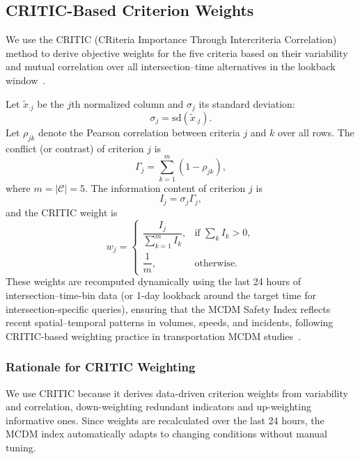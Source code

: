 \documentclass[conference]{IEEEtran}
\begin{document}
\subsection{CRITIC-Based Criterion Weights}

We use the CRITIC (CRiteria Importance Through Intercriteria Correlation) method
to derive objective weights for the five criteria based on their variability and
mutual correlation over all intersection--time alternatives in the lookback
window~\cite{Amraji2025CombinedSafetyIndex}.

Let $\tilde x_{\cdot j}$ be the $j$th normalized column and $\sigma_j$ its
standard deviation:
\[
\sigma_j = \mathrm{sd}(\tilde x_{\cdot j}).
\]
Let $\rho_{jk}$ denote the Pearson correlation between criteria $j$ and $k$
over all rows. The conflict (or contrast) of criterion $j$ is
\begin{equation}
\Gamma_j = \sum_{k=1}^m (1 - \rho_{jk}),
\end{equation}
where $m = |\mathcal{C}| = 5$. The information content of criterion $j$ is
\begin{equation}
I_j = \sigma_j \Gamma_j,
\end{equation}
and the CRITIC weight is
\begin{equation}
w_j =
\begin{cases}
\dfrac{I_j}{\sum_{k=1}^m I_k}, & \text{if }\sum_k I_k > 0,\\[0.8em]
\dfrac{1}{m}, & \text{otherwise}.
\end{cases}
\end{equation}
These weights are recomputed dynamically using the last 24 hours of
intersection--time-bin data (or 1-day lookback around the target time for
intersection-specific queries), ensuring that the MCDM Safety Index reflects
recent spatial--temporal patterns in volumes, speeds, and incidents, following
CRITIC-based weighting practice in transportation MCDM studies~\cite{Amraji2025CombinedSafetyIndex}.

\subsubsection{Rationale for CRITIC Weighting}

We use CRITIC because it derives data-driven criterion weights from variability and correlation, down-weighting redundant indicators and up-weighting informative ones. Since weights are recalculated over the last 24 hours, the MCDM index automatically adapts to changing conditions without manual tuning.
\end{document}

